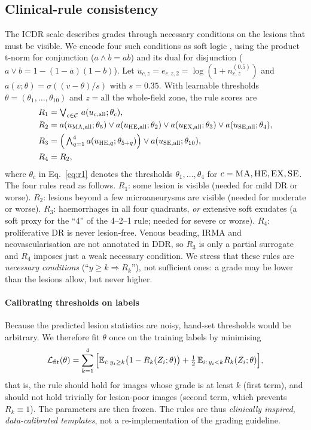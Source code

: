 \subsection{Clinical-rule consistency}
\label{sec:rule}
The ICDR scale describes grades through necessary conditions on the lesions that must be visible. We encode four such conditions as soft logic \citep{diligenti2017sbr,hu2016logic}, using the product t-norm for conjunction ($a\wedge b=ab$) and its dual for disjunction ($a\vee b=1-(1-a)(1-b)$). Let $u_{c,z}=e_{c,z,2}=\log(1+n_{c,z}^{(0.5)})$ and $a(v;\theta)=\sigma((v-\theta)/s)$ with $s=0.35$. With learnable thresholds $\theta=(\theta_1,\dots,\theta_{10})$ and $z=\mathrm{all}$ the whole-field zone, the rule scores are
\begin{align}
R_1&=\textstyle\bigvee_{c\in\mathcal C}\,a(u_{c,\mathrm{all}};\theta_{c}),\label{eq:r1}\\
R_2&=a(u_{\textsc{MA},\mathrm{all}};\theta_5)\vee a(u_{\textsc{HE},\mathrm{all}};\theta_2)\vee a(u_{\textsc{EX},\mathrm{all}};\theta_3)\vee a(u_{\textsc{SE},\mathrm{all}};\theta_4),\label{eq:r2}\\
R_3&=\Big(\textstyle\bigwedge_{q=1}^{4}a(u_{\textsc{HE},q};\theta_{5+q})\Big)\vee a(u_{\textsc{SE},\mathrm{all}};\theta_{10}),\label{eq:r3}\\
R_4&=R_2,\label{eq:r4}
\end{align}
where $\theta_c$ in Eq.~\eqref{eq:r1} denotes the thresholds $\theta_1,\dots,\theta_4$ for $c=\textsc{MA},\textsc{HE},\textsc{EX},\textsc{SE}$. The four rules read as follows. $R_1$: some lesion is visible (needed for mild DR or worse). $R_2$: lesions beyond a few microaneurysms are visible (needed for moderate or worse). $R_3$: haemorrhages in all four quadrants, \emph{or} extensive soft exudates (a soft proxy for the ``4'' of the 4--2--1 rule; needed for severe or worse). $R_4$: proliferative DR is never lesion-free.
Venous beading, IRMA and neovascularisation are not annotated in DDR, so $R_3$ is only a partial surrogate and $R_4$ imposes just a weak necessary condition. We stress that these rules are \emph{necessary conditions} (``$y\ge k\Rightarrow R_k$''), not sufficient ones: a grade may be lower than the lesions allow, but never higher.

\paragraph{Calibrating thresholds on labels} Because the predicted lesion statistics are noisy, hand-set thresholds would be arbitrary. We therefore fit $\theta$ once on the training labels by minimising
\begin{equation}
\mathcal L_{\mathrm{fit}}(\theta)=\sum_{k=1}^{4}\Big[\mathbb{E}_{i:\,y_i\ge k}\big(1-R_k(Z_i;\theta)\big)+\tfrac12\,\mathbb{E}_{i:\,y_i<k}R_k(Z_i;\theta)\Big],
\label{eq:rulefit}
\end{equation}
that is, the rule should hold for images whose grade is at least $k$ (first term), and should not hold trivially for lesion-poor images (second term, which prevents $R_k\equiv1$). The parameters are then frozen. The rules are thus \emph{clinically inspired, data-calibrated templates}, not a re-implementation of the grading guideline.

